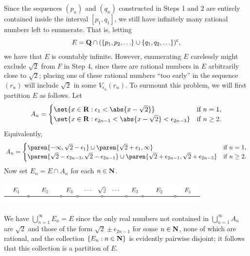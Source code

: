 \documentclass{lew98_solutions}
\begin{document}
\begin{solution}
\begin{enumerate}
        \noindent \hrulefill


        \noindent Since the sequences \( (p_n) \) and \( (q_n) \) constructed in Steps 1 and 2 are entirely contained inside the interval \( [p_1, q_1] \), we still have infinitely many rational numbers left to enumerate. That is, letting
        \[
            E = \mathbf{Q} \cap (\{ p_1, p_2, \ldots \} \cup \{ q_1, q_2, \ldots \})^{\mathsf{c}},
        \]
        we have that \( E \) is countably infinite. However, enumerating \( E \) carelessly might exclude \( \sqrt{2}\) from \( F \) in Step 4, since there are rational numbers in \( E \) arbitrarily close to \( \sqrt{2} \); placing one of these rational numbers ``too early'' in the sequence \( (r_n) \) will include \( \sqrt{2} \) in some \( V_{\epsilon_n}(r_n) \). To surmount this problem, we will first partition \( E \) as follows. Let
        \[
            A_n = \begin{cases}
                \set{ x \in \R : \epsilon_1 < \abs{x - \sqrt{2}} } & \text{if } n = 1, \\
                \set{ x \in \R : \epsilon_{2n - 1} < \abs{x - \sqrt{2}} < \epsilon_{2n - 3} } & \text{if } n \geq 2.
            \end{cases}
        \]
        Equivalently,
        \[
            A_n = \begin{cases}
                \paren{ -\infty, \sqrt{2} - \epsilon_1 } \cup \paren{ \sqrt{2} + \epsilon_1, \infty } & \text{if } n = 1, \\
                \paren{ \sqrt{2} - \epsilon_{2n - 3}, \sqrt{2} - \epsilon_{2n - 1} } \cup \paren{ \sqrt{2} + \epsilon_{2n - 1}, \sqrt{2} + \epsilon_{2n - 3} } & \text{if } n \geq 2.
            \end{cases}
        \]
        Now set \( E_n = E \cap A_n \) for each \( n \in \mathbf{N} \).
        \begin{center}
            \includegraphics[width=0.8\textwidth]{UA_Figures/UA_ex3_4_9_fig_1.pdf}
        \end{center}
        
        We have \( \bigcup_{n=1}^{\infty} E_n = E \) since the only real numbers not contained in \( \bigcup_{n=1}^{\infty} A_n \) are \( \sqrt{2} \) and those of the form \( \sqrt{2} \pm \epsilon_{2n - 1} \) for some \( n \in \mathbf{N} \), none of which are rational, and the collection \( \{ E_n : n \in \mathbf{N} \} \) is evidently pairwise disjoint; it follows that this collection is a partition of \( E \).


\end{enumerate}
\end{solution}
\end{document}
